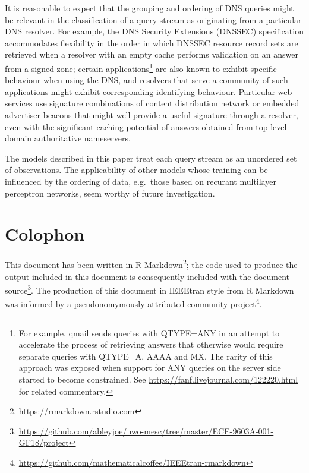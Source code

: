 \documentclass[conference]{IEEEtran}
\begin{document}
It is reasonable to expect that the grouping and ordering of DNS queries
might be relevant in the classification of a query stream as originating
from a particular DNS resolver. For example, the DNS Security Extensions
(DNSSEC) specification\cite{rfc4033} accommodates flexibility in the
order in which DNSSEC resource record sets are retrieved when a resolver
with an empty cache performs validation on an answer from a signed zone;
certain
applications\footnote{For example, qmail sends queries with QTYPE=ANY in an attempt to accelerate the process of retrieving answers that otherwise would require separate queries with QTYPE=A, AAAA and MX. The rarity of this approach was exposed when support for ANY queries on the server side started to become constrained. See \url{https://fanf.livejournal.com/122220.html} for related commentary.}
are also known to exhibit specific behaviour when using the DNS, and
resolvers that serve a community of such applications might exhibit
corresponding identifying behaviour. Particular web services use
signature combinations of content distribution network or embedded
advertiser beacons that might well provide a useful signature through a
resolver, even with the significant caching potential of answers
obtained from top-level domain authoritative nameservers.

The models described in this paper treat each query stream as an
unordered set of observations. The applicability of other models whose
training can be influenced by the ordering of data, e.g.~those based on
recurant multilayer perceptron networks, seem worthy of future
investigation.

\section{Colophon}\label{sec:colophon}

This document has been written in R
Markdown\footnote{\url{https://rmarkdown.rstudio.com}}; the code used to
produce the output included in this document is consequently included
with the document
source\footnote{\url{https://github.com/ableyjoe/uwo-mesc/tree/master/ECE-9603A-001-GF18/project}}.
The production of this document in IEEEtran style from R Markdown was
informed by a pseudonomymously-attributed community
project\footnote{\url{https://github.com/mathematicalcoffee/IEEEtran-rmarkdown}}.


\end{document}
